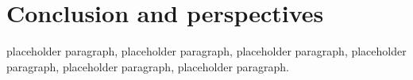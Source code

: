 \chapter*{Conclusion and perspectives}

\quad 

placeholder paragraph, placeholder paragraph, placeholder paragraph, placeholder paragraph, placeholder paragraph, placeholder paragraph.